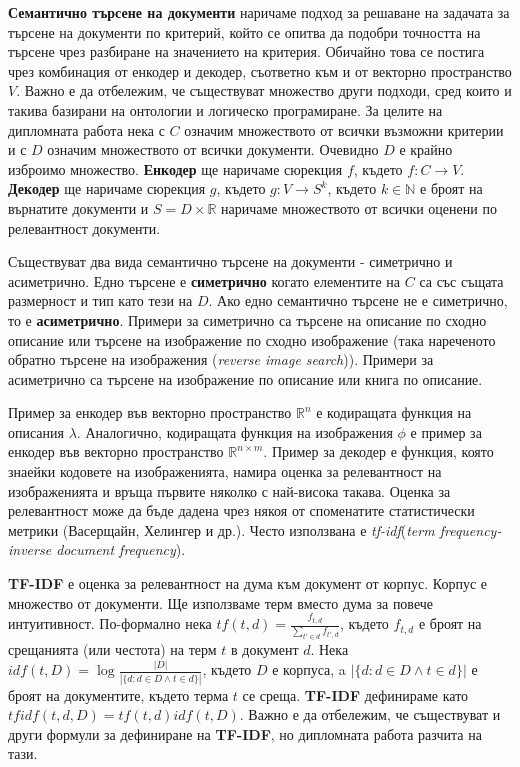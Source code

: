 \documentclass[a4paper,12pt]{article}
\begin{document}
\textbf{Семантично търсене на документи} наричаме подход за решаване на задачата за търсене на документи по критерий, който се опитва да подобри точността на търсене чрез разбиране на значението на критерия. Обичайно това се постига чрез комбинация от енкодер и декодер, съответно към и от векторно пространство $V$. Важно е да отбележим, че съществуват множество други подходи, сред които и такива базирани на онтологии и логическо програмиране. За целите на дипломната работа нека с $C$ означим множеството от всички възможни критерии и с $D$ означим множеството от всички документи. Очевидно $D$ е крайно изброимо множество. \textbf{Енкодер} ще наричаме сюрекция $f$, където $f: C \to V$. \textbf{Декодер} ще наричаме сюрекция $g$, където $g: V \to S^k$, където $k \in \mathbb{N}$ е броят на върнатите документи и $S = D \times \mathbb{R}$ наричаме множеството от всички оценени по релевантност документи.

\bigbreak

Съществуват два вида семантично търсене на документи - симетрично и асиметрично. Едно търсене е \textbf{симетрично} когато елементите на $C$ са със същата размерност и тип като тези на $D$. Ако едно семантично търсене не е симетрично, то е \textbf{асиметрично}. Примери за симетрично са търсене на описание по сходно описание или търсене на изображение по сходно изображение (така нареченото обратно търсене на изображения (\textit{reverse image search})). Примери за асиметрично са търсене на изображение по описание или книга по описание.

\bigbreak

Пример за енкодер във векторно пространство $\mathbb{R}^n$ е кодиращата функция на описания $\lambda$. Аналогично, кодиращата функция на изображения $\phi$ е пример за енкодер във векторно пространство $\mathbb{R}^{n \times m}$. Пример за декодер е функция, която знаейки кодовете на изображенията, намира оценка за релевантност на изображенията и връща първите няколко с най-висока такава. Оценка за релевантност може да бъде дадена чрез някоя от споменатите статистически метрики (Васерщайн, Хелингер и др.). Често използвана е \textit{tf-idf}(\textit{term frequency-inverse document frequency}).

\bigbreak

\textbf{TF-IDF} е оценка за релевантност на дума към документ от корпус. Корпус е множество от документи. Ще използваме терм вместо дума за повече интуитивност. По-формално нека $tf(t, d) = \frac{f_{t,d}}{\sum_{t' \in d} f_{t', d}}$, където $f_{t,d}$ е броят на срещанията (или честота) на терм $t$ в документ $d$. Нека $idf(t,D) = \log \frac{|D|}{|\{d : d \in D \land t \in d \}|}$, където $D$ е корпуса, a $|\{d : d \in D \land t \in d \}|$ е броят на документите, където терма $t$ се среща. \textbf{TF-IDF} дефинираме като $tfidf(t,d,D) = tf(t,d) idf(t,D)$. Важно е да отбележим, че съществуват и други формули за дефиниране на \textbf{TF-IDF}, но дипломната работа разчита на тази.
\end{document}
